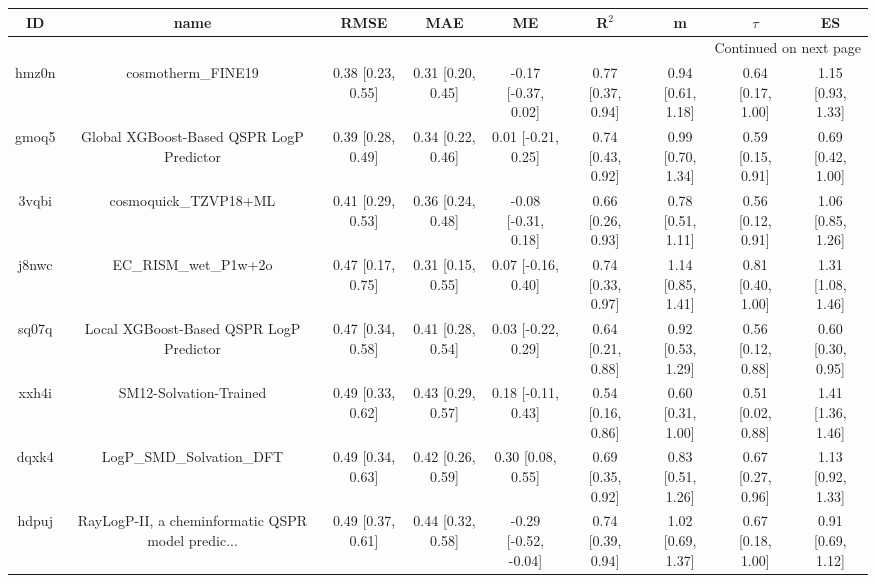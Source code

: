 \documentclass{article}
\begin{document}
\begin{center}
\scriptsize
\begin{longtable}{|ccccccccc|}
\toprule
    ID &                                               name &               RMSE &                MAE &                    ME &              R$^2$ &                    m &               $\tau$ &                    ES \\
\midrule
\endhead
\midrule
\multicolumn{9}{r}{{Continued on next page}} \\
\midrule
\endfoot

\bottomrule
\endlastfoot
 hmz0n &                                 cosmotherm\_FINE19 &  0.38 [0.23, 0.55] &  0.31 [0.20, 0.45] &   -0.17 [-0.37, 0.02] &  0.77 [0.37, 0.94] &    0.94 [0.61, 1.18] &    0.64 [0.17, 1.00] &     1.15 [0.93, 1.33] \\
 gmoq5 &           Global XGBoost-Based QSPR LogP Predictor &  0.39 [0.28, 0.49] &  0.34 [0.22, 0.46] &    0.01 [-0.21, 0.25] &  0.74 [0.43, 0.92] &    0.99 [0.70, 1.34] &    0.59 [0.15, 0.91] &     0.69 [0.42, 1.00] \\
 3vqbi &                              cosmoquick\_TZVP18+ML &  0.41 [0.29, 0.53] &  0.36 [0.24, 0.48] &   -0.08 [-0.31, 0.18] &  0.66 [0.26, 0.93] &    0.78 [0.51, 1.11] &    0.56 [0.12, 0.91] &     1.06 [0.85, 1.26] \\
 j8nwc &                              EC\_RISM\_wet\_P1w+2o &  0.47 [0.17, 0.75] &  0.31 [0.15, 0.55] &    0.07 [-0.16, 0.40] &  0.74 [0.33, 0.97] &    1.14 [0.85, 1.41] &    0.81 [0.40, 1.00] &     1.31 [1.08, 1.46] \\
 sq07q &            Local XGBoost-Based QSPR LogP Predictor &  0.47 [0.34, 0.58] &  0.41 [0.28, 0.54] &    0.03 [-0.22, 0.29] &  0.64 [0.21, 0.88] &    0.92 [0.53, 1.29] &    0.56 [0.12, 0.88] &     0.60 [0.30, 0.95] \\
 xxh4i &                             SM12-Solvation-Trained &  0.49 [0.33, 0.62] &  0.43 [0.29, 0.57] &    0.18 [-0.11, 0.43] &  0.54 [0.16, 0.86] &    0.60 [0.31, 1.00] &    0.51 [0.02, 0.88] &     1.41 [1.36, 1.46] \\
 dqxk4 &                          LogP\_SMD\_Solvation\_DFT &  0.49 [0.34, 0.63] &  0.42 [0.26, 0.59] &     0.30 [0.08, 0.55] &  0.69 [0.35, 0.92] &    0.83 [0.51, 1.26] &    0.67 [0.27, 0.96] &     1.13 [0.92, 1.33] \\
 hdpuj &  RayLogP-II, a cheminformatic QSPR model predic... &  0.49 [0.37, 0.61] &  0.44 [0.32, 0.58] &  -0.29 [-0.52, -0.04] &  0.74 [0.39, 0.94] &    1.02 [0.69, 1.37] &    0.67 [0.18, 1.00] &     0.91 [0.69, 1.12] \\

\end{longtable}
\end{center}
\end{document}
